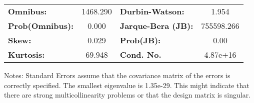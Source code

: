 \begin{center}
\begin{tabular}{lcccccc}
\bottomrule
\end{tabular}
\begin{tabular}{lclc}
\textbf{Omnibus:}       & 1468.290 & \textbf{  Durbin-Watson:     } &     1.954   \\
\textbf{Prob(Omnibus):} &   0.000  & \textbf{  Jarque-Bera (JB):  } & 755598.266  \\
\textbf{Skew:}          &   0.029  & \textbf{  Prob(JB):          } &      0.00   \\
\textbf{Kurtosis:}      &  69.948  & \textbf{  Cond. No.          } &  4.87e+16   \\
\bottomrule
\end{tabular}
\end{center}

Notes: \newline
 [1] Standard Errors assume that the covariance matrix of the errors is correctly specified. \newline
 [2] The smallest eigenvalue is 1.35e-29. This might indicate that there are \newline
 strong multicollinearity problems or that the design matrix is singular.